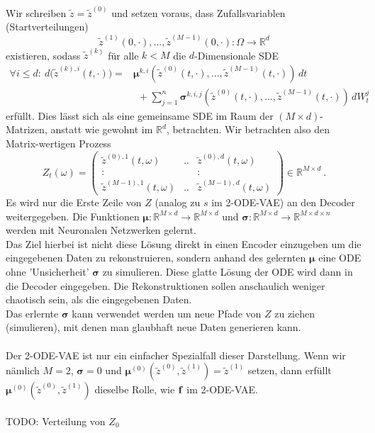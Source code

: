 \documentclass[12pt]{article}
\newcommand{\R}{\mathbb{R}}
\newcommand{\tz}{\widetilde{z}}
\newcommand{\bbf}{\bold{f}}
\newcommand{\bmu}{\bm{\mu}}
\newcommand{\bsig}{\bm{\sigma}}
\begin{document}
	Wir schreiben $\tz = \tz^{(0)}$ und setzen voraus, dass Zufallsvariablen (Startverteilungen)
	$$\tz^{(1)}(0,\cdot) ,..., \tz^{(M-1)}(0,\cdot): \Omega \rightarrow \R^d$$
	existieren, sodass $\tz^{(k)}$ für alle $k < M$ die $d$-Dimensionale SDE
	\begin{align*}
	\forall i \leq d: \ d \big(\tz^{(k),i}(t,\cdot)\big) = & \bmu^{k,i}(\tz^{(0)}(t,\cdot),...,\tz^{(M-1)}(t,\cdot)) \, dt\\
	& \ \ + \sum\limits_{j=1}^n \bsig^{k,i,j}(\tz^{(0)}(t,\cdot),...,\tz^{(M-1)}(t,\cdot)) \, dW^j_t
	\end{align*}
	erfüllt. Dies lässt sich als eine gemeinsame SDE im Raum der $(M \times d)$-Matrizen, anstatt wie gewohnt im $\R^d$, betrachten. Wir betrachten also den Matrix-wertigen Prozess
	$$ Z_t(\omega) = \begin{pmatrix}
	\tz^{(0),1}(t,\omega) & .. & \tz^{(0),d}(t,\omega)\\
	: & & : \\
	\tz^{(M-1),1}(t,\omega) & .. & \tz^{(M-1),d}(t,\omega)
	\end{pmatrix} \in \R^{M \times d} \ .$$
	Es wird nur die Erste Zeile von $Z$ (analog zu $s$ im 2-ODE-VAE) an den Decoder weitergegeben. Die Funktionen $\bmu : \R^{M \times d} \rightarrow \R^{M \times d}$ und $\bsig : \R^{M \times d} \rightarrow \R^{M \times d \times n}$ werden mit Neuronalen Netzwerken gelernt.\\
	Das Ziel hierbei ist nicht diese Lösung direkt in einen Encoder einzugeben um die eingegebenen Daten zu rekonstruieren, sondern anhand des gelernten $\bmu$ eine ODE ohne 'Unsicherheit' $\bsig$ zu simulieren. Diese glatte Lösung der ODE wird dann in die Decoder eingegeben. Die Rekonstruktionen sollen anschaulich weniger chaotisch sein, als die eingegebenen Daten.\\
	Das erlernte $\bsig$ kann verwendet werden um neue Pfade von $Z$ zu ziehen (simulieren), mit denen man glaubhaft neue Daten generieren kann.\\
	\\
	Der 2-ODE-VAE ist nur ein einfacher Spezialfall dieser Darstellung. Wenn wir nämlich $M=2$, $\bsig = 0$ und $\bmu^{(0)}(\tz^{(0)},\tz^{(1)}) = \tz^{(1)}$ setzen, dann erfüllt $\bmu^{(0)}(\tz^{(0)},\tz^{(1)})$ dieselbe Rolle, wie $\bbf$ im 2-ODE-VAE.\\
	\\
	TODO: Verteilung von $Z_0$






	\newpage
\end{document}
